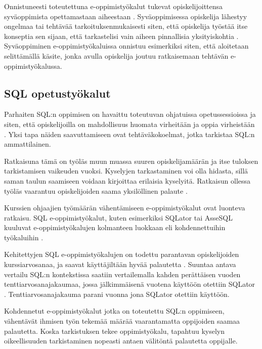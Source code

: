 \documentclass[finnish,twoside,openright]{HYgraduMLDS}
\begin{document}
Onnistuneesti toteutettuna e-oppimistyökalut tukevat opiskelijoittensa syväoppimista opettamastaan aiheestaan \cite{sadiq2004sqlator}. Syväoppimisessa opiskelija lähestyy ongelmaa tai tehtävää tarkoituksenmukaisesti siten, että opiskelija työstää itse konseptia sen sijaan, että tarkastelisi vain aiheen pinnallisia yksityiskohtia \cite{biggs2011teaching}. Syväoppiminen e-oppimistyökaluissa onnistuu esimerkiksi siten, että aloitetaan selittämällä käsite, jonka avulla opiskelija joutuu ratkaisemaan tehtävän e-oppimistyökalussa.


\subsection{SQL opetustyökalut}

Parhaiten SQL:n oppimisen on havaittu toteutuvan ohjatuissa opetussessioissa ja siten, että opiskelijoilla on mahdollisuus huomata virheitään ja oppia virheistään \cite{sadiq2004sqlator}. Yksi tapa näiden saavuttamiseen ovat tehtäväkokoelmat, jotka tarkistaa SQL:n ammattilainen. 

Ratkaisuna tämä on työläs muun muassa suuren opiskelijamäärän ja itse tuloksen tarkistamisen vaikeuden vuoksi. Kyselyjen tarkastaminen voi olla hidasta, sillä saman taulun saamiseen voidaan kirjoittaa erilaisia kyselyitä. Ratkaisun ollessa työläs vaarantuu opiskelijoiden saama yksilöllinen palaute \cite{sadiq2004sqlator}.

Kurssien ohjaajien työmäärän vähentämiseen e-oppimistyökalut ovat luonteva ratkaisu. SQL e-oppimistyökalut, kuten esimerkiksi SQLator \cite{sadiq2004sqlator} tai AsseSQL \cite{prior2014assesql} kuuluvat e-oppimistyökalujen kolmanteen luokkaan eli kohdennettuihin työkaluihin \cite{sadiq2004sqlator}.

Kehitettyjen SQL e-oppimistyökalujen on todettu parantavan opiskelijoiden kurssiarvosanaa, ja saavat käyttäjiltään hyvää palautetta \cite{Brusilovsky:2010:LSP:1656255.1656257}. Suuntaa antava vertailu SQL:n kontekstissa saatiin vertailemalla kahden perättäisen vuoden tenttiarvosanajakaumaa, jossa jälkimmäisenä vuotena käyttöön otettiin SQLator \cite{sadiq2004sqlator}. Tenttiarvosanajakauma parani vuonna jona SQLator otettiin käyttöön.

Kohdennetut e-oppimistyökalut jotka on toteutettu SQL:n oppimiseen, vähentävät ihmisen työn tekemää määrää vaarantamatta oppijoiden saamaa palautetta. Koska tarkistuksen tekee oppimistyökalu, tapahtuu kyselyn oikeellisuuden tarkistaminen nopeasti antaen välitöntä palautetta oppijalle. 
\end{document}
